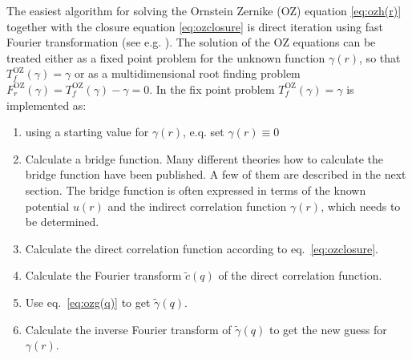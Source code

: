 The easiest algorithm for solving the Ornstein Zernike (OZ) equation \ref{eq:ozh(r)} together with the closure equation \ref{eq:ozclosure} is direct iteration using fast Fourier transformation (see e.g. \cite{Homeier1995}). The solution of the OZ equations can be treated either as a fixed point problem for the unknown function $\gamma(r)$, so that $T^\mathrm{OZ}_f(\gamma)=\gamma$ or as a multidimensional root finding problem $F^\mathrm{OZ}_r(\gamma)=T^\mathrm{OZ}_f(\gamma)-\gamma=0$. In \SASfit the fix point problem $T^\mathrm{OZ}_f(\gamma)=\gamma$ is implemented as:
\begin{enumerate}
\item using a starting value for $\gamma(r)$, e.q. set $\gamma(r)\equiv 0$
\item Calculate a bridge function. Many different theories how to calculate the bridge function have been published. A few of them are described in the next section. The bridge function is often expressed in terms of the known potential $u(r)$ and the indirect correlation function $\gamma(r)$, which needs to be determined.
\item Calculate the direct correlation function according to eq.\ \ref{eq:ozclosure}.
\item Calculate the Fourier transform $\tilde{c}(q)$ of the direct correlation function.
\item Use eq.\ \ref{eq:ozg(q)} to get $\tilde{\gamma}(q)$.
\item Calculate the inverse Fourier transform of $\tilde{\gamma}(q)$ to get the new guess for $\gamma(r)$.
\end{enumerate}
